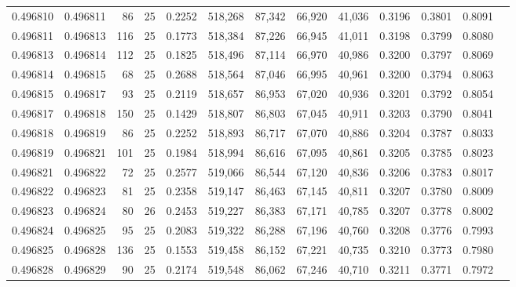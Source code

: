 \begin{tabular}{rrrrrrrrrrrrr}
0.496810 & 0.496811 &    86 &  25 &                                     0.2252 & 518,268 &  87,342 &  66,920 &  41,036 & 0.3196 & 0.3801 & 0.8091 \\
0.496811 & 0.496813 &   116 &  25 &                                     0.1773 & 518,384 &  87,226 &  66,945 &  41,011 & 0.3198 & 0.3799 & 0.8080 \\
0.496813 & 0.496814 &   112 &  25 &                                     0.1825 & 518,496 &  87,114 &  66,970 &  40,986 & 0.3200 & 0.3797 & 0.8069 \\
0.496814 & 0.496815 &    68 &  25 &                                     0.2688 & 518,564 &  87,046 &  66,995 &  40,961 & 0.3200 & 0.3794 & 0.8063 \\
0.496815 & 0.496817 &    93 &  25 &                                     0.2119 & 518,657 &  86,953 &  67,020 &  40,936 & 0.3201 & 0.3792 & 0.8054 \\
0.496817 & 0.496818 &   150 &  25 &                                     0.1429 & 518,807 &  86,803 &  67,045 &  40,911 & 0.3203 & 0.3790 & 0.8041 \\
0.496818 & 0.496819 &    86 &  25 &                                     0.2252 & 518,893 &  86,717 &  67,070 &  40,886 & 0.3204 & 0.3787 & 0.8033 \\
0.496819 & 0.496821 &   101 &  25 &                                     0.1984 & 518,994 &  86,616 &  67,095 &  40,861 & 0.3205 & 0.3785 & 0.8023 \\
0.496821 & 0.496822 &    72 &  25 &                                     0.2577 & 519,066 &  86,544 &  67,120 &  40,836 & 0.3206 & 0.3783 & 0.8017 \\
0.496822 & 0.496823 &    81 &  25 &                                     0.2358 & 519,147 &  86,463 &  67,145 &  40,811 & 0.3207 & 0.3780 & 0.8009 \\
0.496823 & 0.496824 &    80 &  26 &                                     0.2453 & 519,227 &  86,383 &  67,171 &  40,785 & 0.3207 & 0.3778 & 0.8002 \\
0.496824 & 0.496825 &    95 &  25 &                                     0.2083 & 519,322 &  86,288 &  67,196 &  40,760 & 0.3208 & 0.3776 & 0.7993 \\
0.496825 & 0.496828 &   136 &  25 &                                     0.1553 & 519,458 &  86,152 &  67,221 &  40,735 & 0.3210 & 0.3773 & 0.7980 \\
0.496828 & 0.496829 &    90 &  25 &                                     0.2174 & 519,548 &  86,062 &  67,246 &  40,710 & 0.3211 & 0.3771 & 0.7972 \\

\end{tabular}

